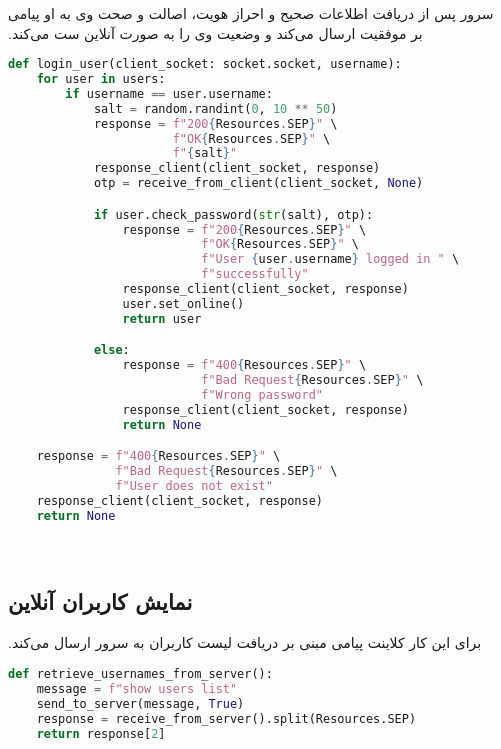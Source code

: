 ‫ سرور پس از دریافت اطلاعات صحیح و احراز هویت، اصالت و صحت وی به او پیامی بر موفقیت ارسال می‌کند و وضعیت وی را به صورت آنلاین ست می‌کند.
‫
\begin{latin}
\begin{lstlisting}[firstnumber=112, language=Python]
def login_user(client_socket: socket.socket, username):
    for user in users:
        if username == user.username:
            salt = random.randint(0, 10 ** 50)
            response = f"200{Resources.SEP}" \
                       f"OK{Resources.SEP}" \
                       f"{salt}"
            response_client(client_socket, response)
            otp = receive_from_client(client_socket, None)

            if user.check_password(str(salt), otp):
                response = f"200{Resources.SEP}" \
                           f"OK{Resources.SEP}" \
                           f"User {user.username} logged in " \
                           f"successfully"
                response_client(client_socket, response)
                user.set_online()
                return user

            else:
                response = f"400{Resources.SEP}" \
                           f"Bad Request{Resources.SEP}" \
                           f"Wrong password"
                response_client(client_socket, response)
                return None

    response = f"400{Resources.SEP}" \
               f"Bad Request{Resources.SEP}" \
               f"User does not exist"
    response_client(client_socket, response)
    return None
\end{lstlisting}
\end{latin}

‫\subsection{نمایش کاربران آنلاین}
‫برای این کار کلاینت پیامی مبنی بر دریافت لیست کاربران به سرور ارسال می‌کند.
‫
\begin{latin}
\begin{lstlisting}[firstnumber=238, language=Python]
def retrieve_usernames_from_server():
    message = f"show users list"
    send_to_server(message, True)
    response = receive_from_server().split(Resources.SEP)
    return response[2]
\end{lstlisting}
\end{latin}

